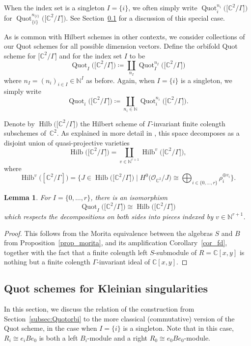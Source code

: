 \documentclass[10pt,a4paper]{amsart}
\newtheorem{Lemma}[Theorem]{Lemma}
\newcommand{\SC}{\mathbb{C}} %
\newcommand{\PiGamma}{B}
\DeclareMathOperator{\Hilb}{\mathrm{Hilb}}
\DeclareMathOperator{\Quot}{\mathrm{Quot}}
\newcommand{\QuotI}[1][ ]{\Quot_I^{#1}}
\newcommand{\QuotInI}{\QuotI[n_I]}
\newcommand{\Quoti}[1][ ]{\Quot_i^{#1}}
\newcommand{\Quotini}{\Quoti[n_i]}
\numberwithin{equation}{section}
\begin{document}
When the index set is a singleton $I=\{i\}$, we
often simply write $\Quotini \big(\big[\SC^2/\Gamma\big]\big)$ for $\Quot_{\{i\}}^{n_{\{i\}}}\big(\big[\SC^2/\Gamma\big]\big)$. See Section~\ref{sect_quot_quot} for a
discussion of this special case.

As is common with Hilbert schemes in other contexts, we
consider collections of our Quot schemes for all
possible dimension vectors. Define the
orbifold Quot scheme for $\big[\SC^2/\Gamma\big]$ and for the index set $I$ to be
\[ \QuotI \big(\big[\SC^2/\Gamma\big]\big)\coloneqq\coprod_{n_I} \QuotInI\big(\big[\SC^2/\Gamma\big]\big) \]
where $n_I=(n_i)_{i \in I} \in \mathbb{N}^{I}$ as before.
Again, when $I=\{i\}$ is a singleton, we simply write
\[
\Quoti \big(\big[\SC^2/\Gamma\big]\big)\coloneqq\coprod_{n_i\in \mathbb{N}}\Quotini \big(\big[\SC^2/\Gamma\big]\big).\]

 Denote by $\Hilb\big(\big[\SC^2/\Gamma\big]\big)$ the Hilbert scheme of $\Gamma$-invariant finite colength subschemes of~$\SC^2$. As explained in more detail in \cite[Section~1.1]{gyenge2018euler}, this space decomposes as a disjoint union of quasi-projective varieties
\[\Hilb\big(\big[\SC^2/\Gamma\big]\big) = \coprod_{v\in \mathbb{N}^{r+1}}\Hilb^v\big(\big[\SC^2/\Gamma\big]\big),
\]
where \[\Hilb^v\big([\SC^2/\Gamma]\big) =\Big\{J\in \Hilb\big(\big[\SC^2/\Gamma\big]\big)\mid H^0\big(\mathcal{O}_{\SC^2}/J\big) \cong \bigoplus_{i\in \{0, \dots, r\}} \rho_i^{\oplus v_i}\Big\}.\]

\begin{Lemma}\label{lem:HilbMor}
For $I=\{0,\dots,r\}$, there is an isomorphism
\[\QuotI \big(\big[\SC^2/\Gamma\big]\big) \cong \Hilb\big(\big[\SC^2/\Gamma\big]\big)\]
which respects the decompositions on both sides into pieces indexed by $v\in \mathbb{N}^{r+1}$.
\end{Lemma}
\begin{proof} This follows from the Morita equivalence between the algebras $S$
and $\PiGamma$ from Proposition~\ref{prop_morita}, and
its amplification Corollary~\ref{cor_fd}, together with the fact that a finite colength left $S$-submodule of $R=\SC[x,y]$ is nothing but a finite colength $\Gamma$-invariant ideal of $\SC[x,y]$.
\end{proof}

\subsection{Quot schemes for Kleinian singularities}
\label{sect_quot_quot}
In this section, we discuss the relation of the construction from Section~\ref{subsec:Quotorbi} to the more classical (commutative) version of the Quot scheme, in the case when $I=\{i\}$ is a singleton.
Note that in this case, $R_i\cong e_i\PiGamma e_0$
 is both a left $B_i$-module and a right $R_0\cong e_0\PiGamma e_0$-module.
\end{document}
